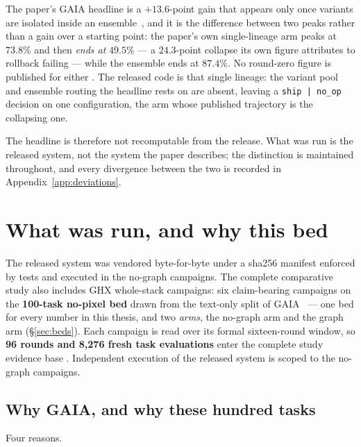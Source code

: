 The paper's GAIA headline is a $+13.6$-point gain that appears only once
variants are isolated inside an ensemble~\cite{aegis}, and it is the
difference between two peaks rather than a gain over a starting point: the
paper's own single-lineage arm peaks at $73.8\%$ and then \emph{ends at}
$49.5\%$ --- a $24.3$-point collapse its own figure attributes to rollback
failing --- while the ensemble ends at $87.4\%$. No round-zero figure is
published for either . The released code is that single lineage: the
variant pool and ensemble routing the headline rests on are absent, leaving
a \texttt{ship\,|\,no\_op} decision on one configuration, the arm whose
published trajectory is the collapsing one.

The headline is therefore not recomputable from the release. What was run
is the released system, not the system the paper describes; the
distinction is maintained throughout, and every divergence between the two
is recorded in Appendix~\ref{app:deviations}.

\section{What was run, and why this bed}
\label{sec:what-was-run}

The released system was vendored byte-for-byte under a sha256 manifest
enforced by tests and executed in the no-graph campaigns. The complete
comparative study also includes GHX whole-stack campaigns: six claim-bearing
campaigns on the \textbf{100-task no-pixel bed} drawn from the text-only
split of GAIA~\cite{gaia} --- one bed for every number in this thesis, and
two \emph{arms}, the no-graph arm and the graph arm (\S\ref{sec:beds}).
Each campaign is read over its formal sixteen-round window, so
\textbf{96 rounds and 8{,}276 fresh task evaluations} enter the complete
study evidence base . Independent execution of the released system is
scoped to the no-graph campaigns.

\subsection*{Why GAIA, and why these hundred tasks}

Four reasons.

